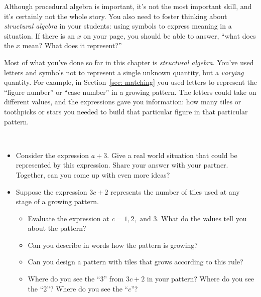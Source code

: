 \bigskip

Although procedural algebra is important, it's not the most important skill, and it's certainly not the whole story.
You also need to foster thinking about  \emph{structural algebra} in your students: using symbols to express meaning in a situation.  If there is an $x$ on your page, you should be able to answer, ``what does the $x$ mean?  What does it represent?''  

Most of what you've done so far in this chapter is \emph{structural algebra}.  You've used letters and symbols not to represent a single unknown quantity, but a \emph{varying} quantity.  For example, in Section~\ref{sec: matching} you used letters to represent the ``figure number'' or ``case number'' in a growing pattern.  The letters could take on different values, and the expressions gave you information: how many tiles or toothpicks or stars you needed to build that particular figure in that particular pattern.

\newpage

\begin{thinkpair*}\ 
\begin{itemize}
\item
Consider the expression $a + 3$.  Give a real world situation that could be represented by this expression.  Share your answer with your partner.  Together, can you come up with even more ideas?\\
\item
Suppose the expression $3c+2$ represents the number of tiles used at any stage of a growing pattern. 
\begin{itemize}
\item
 Evaluate the expression at $c = 1, 2, \text{ and } 3$.  What do the values tell you about the pattern?  \\
 \item
 Can you describe in words how the pattern is growing?  \\
 \item
 Can you design a pattern with tiles that grows according to this rule?\\
 \item
 Where do you see the ``3'' from $3c+2$ in your pattern?  Where do you see the ``2''?  Where do you see the ``$c$''?
\end{itemize}
\end{itemize}
\end{thinkpair*}


\newpage


